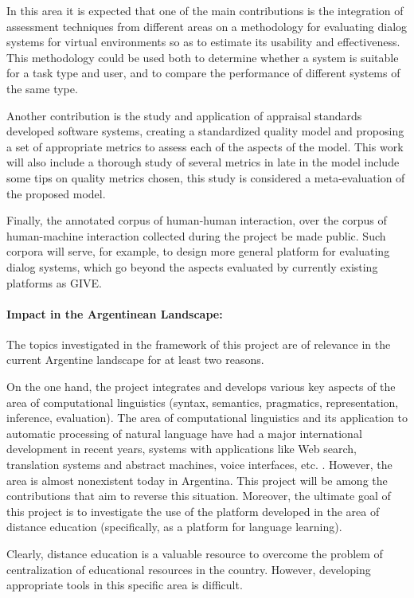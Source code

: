 In this area it is expected that one of the main contributions is the
integration of assessment techniques from different areas on a methodology for
evaluating dialog systems for virtual environments so as to estimate its
usability and effectiveness. This methodology could be used both to determine
whether a system is suitable for a task type and user, and to compare the
performance of different systems of the same type.

Another contribution is the study and application of appraisal standards
developed software systems, creating a standardized quality model and proposing
a set of appropriate metrics to assess each of the aspects of the model. This
work will also include a thorough study of several metrics in late in the model
include some tips on quality metrics chosen, this study is considered a
meta-evaluation of the proposed model.

Finally, the annotated corpus of human-human interaction, over the corpus of
human-machine interaction collected during the project be made public. Such
corpora will serve, for example, to design more general platform for evaluating
dialog systems, which go beyond the aspects evaluated by currently existing
platforms as GIVE.

\paragraph{Impact in the Argentinean Landscape:} The topics investigated in the framework of this project are of relevance in the
current Argentine landscape for at least two reasons.

On the one hand, the project integrates and develops various key aspects of the
area of computational linguistics (syntax, semantics, pragmatics,
representation, inference, evaluation). The area of computational linguistics
and its application to automatic processing of natural language have had a major
international development in recent years, systems with applications like Web
search, translation systems and abstract machines, voice interfaces, etc. .
However, the area is almost nonexistent today in Argentina. This project will be
among the contributions that aim to reverse this situation. Moreover, the
ultimate goal of this project is to investigate the use of the platform
developed in the area of distance education (specifically, as a platform for
language learning).

Clearly, distance education is a valuable resource to overcome the problem of
centralization of educational resources in the country. However, developing
appropriate tools in this specific area is difficult.

